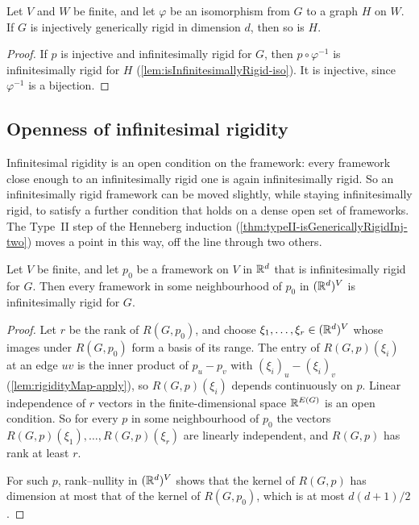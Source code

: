 \begin{lemma}
  \label{lem:isGenericallyRigidInj-iso}
  \leanok
  Let $V$ and $W$ be finite, and let $\varphi$ be an isomorphism from
  $G$ to a graph $H$ on $W$. If $G$ is injectively generically rigid
  in dimension $d$, then so is $H$.
\end{lemma}
\begin{proof}
  \leanok
  If $p$ is injective and infinitesimally rigid for $G$, then
  $p \circ \varphi^{-1}$ is infinitesimally rigid for $H$
  (\cref{lem:isInfinitesimallyRigid-iso}). It is injective, since
  $\varphi^{-1}$ is a bijection.
\end{proof}

\subsection{Openness of infinitesimal rigidity}
\label{sec:rigidity-openness}

Infinitesimal rigidity is an open condition on the framework: every
framework close enough to an infinitesimally rigid one is again
infinitesimally rigid. So an infinitesimally rigid framework can be
moved slightly, while staying infinitesimally rigid, to satisfy a
further condition that holds on a dense open set of frameworks. The
Type~II step of the Henneberg induction
(\cref{thm:typeII-isGenericallyRigidInj-two}) moves a point in this
way, off the line through two others.

\begin{lemma}
  \label{lem:isInfinitesimallyRigid-eventually}
  \leanok
  Let $V$ be finite, and let $p_0$ be a framework on $V$ in ${\mathbb{R}}^{d}$
  that is infinitesimally rigid for $G$. Then every framework in some
  neighbourhood of $p_0$ in $({\mathbb{R}}^{d})^{V}$ is infinitesimally rigid for
  $G$.
\end{lemma}
\begin{proof}
  \leanok
  Let $r$ be the rank of $R(G, p_0)$, and choose
  $\xi_1, \dots, \xi_r \in ({\mathbb{R}}^{d})^{V}$ whose images under
  $R(G, p_0)$ form a basis of its range. The entry of
  $R(G, p)(\xi_i)$ at an edge $uv$ is the inner product of $p_u - p_v$
  with $(\xi_i)_u - (\xi_i)_v$ (\cref{lem:rigidityMap-apply}), so
  $R(G, p)(\xi_i)$ depends continuously on $p$. Linear independence of
  $r$ vectors in the finite-dimensional space ${\mathbb{R}}^{E(G)}$ is an open
  condition. So for every $p$ in some neighbourhood of $p_0$ the
  vectors $R(G, p)(\xi_1), \dots, R(G, p)(\xi_r)$ are linearly
  independent, and $R(G, p)$ has rank at least $r$.

  For such $p$, rank--nullity in $({\mathbb{R}}^{d})^{V}$ shows that the kernel
  of $R(G, p)$ has dimension at most that of the kernel of
  $R(G, p_0)$, which is at most $d(d+1)/2$.
\end{proof}

